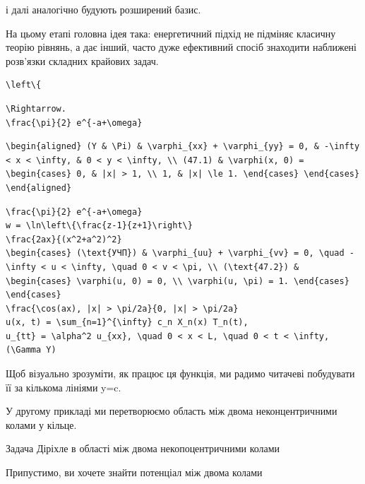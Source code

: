 \documentclass[
  ukrainian,
]{article}
\begin{document}
і далі аналогічно будують розширений базис.

На цьому етапі головна ідея така: енергетичний підхід не підміняє
класичну теорію рівнянь, а дає інший, часто дуже ефективний спосіб
знаходити наближені розв'язки складних крайових задач.

\begin{verbatim}
\left\{
\end{verbatim}

\begin{verbatim}
\Rightarrow.
\frac{\pi}{2} e^{-a+\omega}
\end{verbatim}

\begin{verbatim}
\begin{aligned} (Y & \Pi) & \varphi_{xx} + \varphi_{yy} = 0, & -\infty < x < \infty, & 0 < y < \infty, \\ (47.1) & \varphi(x, 0) = \begin{cases} 0, & |x| > 1, \\ 1, & |x| \le 1. \end{cases} \end{cases} \end{aligned}
\end{verbatim}

\begin{verbatim}
\frac{\pi}{2} e^{-a+\omega}
w = \ln\left\{\frac{z-1}{z+1}\right\}
\frac{2ax}{(x^2+a^2)^2}
\begin{cases} (\text{УЧП}) & \varphi_{uu} + \varphi_{vv} = 0, \quad -\infty < u < \infty, \quad 0 < v < \pi, \\ (\text{47.2}) & \begin{cases} \varphi(u, 0) = 0, \\ \varphi(u, \pi) = 1. \end{cases} \end{cases}
\frac{\cos(ax), |x| > \pi/2a}{0, |x| > \pi/2a}
u(x, t) = \sum_{n=1}^{\infty} c_n X_n(x) T_n(t),
u_{tt} = \alpha^2 u_{xx}, \quad 0 < x < L, \quad 0 < t < \infty,
(\Gamma Y)
\end{verbatim}

Щоб візуально зрозуміти, як працює ця функція, ми радимо читачеві
побудувати її за кількома лініями y=c.

У другому прикладі ми перетворюємо область між двома неконцентричними
колами у кільце.

Задача Діріхле в області між двома некопоцентричними колами

Припустимо, ви хочете знайти потенціал між двома колами
\end{document}
